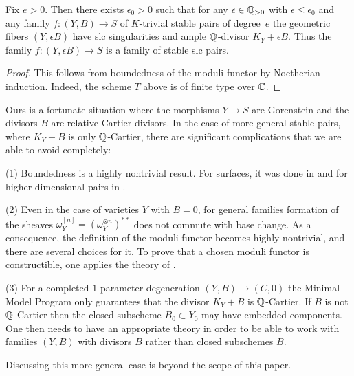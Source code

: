\documentclass[table,x11names]{amsart}
\begin{document}
\begin{corollary}
  Fix $e>0$. Then there exists $\epsilon_0>0$ such that for any
  $\epsilon\in{\mathbb Q}_{>0}$ with $\epsilon\le\epsilon_0$ and any family
  $f\colon (Y,B)\to S$ of $K$-trivial stable pairs of degree~$e$
  the geometric fibers $(Y,\epsilon B)$ have slc singularities and
  ample ${\mathbb Q}$-divisor $K_Y+\epsilon B$. Thus the family
  $f\colon (Y,\epsilon B)\to S$ is a family of stable slc pairs.
\end{corollary}
\begin{proof}
  This follows from boundedness of the moduli functor by Noetherian
  induction. Indeed, the scheme $T$ above is of finite type over
  ${\mathbb C}$.
\end{proof}

\begin{remark} \label{rem:general-slc-moduli} Ours is a fortunate
  situation where the morphisms $Y\to S$ are Gorenstein and the
  divisors $B$ are relative Cartier divisors. In the case of more
  general stable pairs, where $K_Y+B$ is only ${\mathbb Q}$-Cartier, there are
  significant complications that we are able to avoid completely:

  (1) Boundedness is a highly nontrivial result. For surfaces, it was
  done in \cite{alexeev1994boundedness-and-ksp-2} and for higher
  dimensional pairs in \cite{hacon2018boundedness-moduli}.

  (2) Even in the case of varieties $Y$ with $B=0$, for general
  families formation of the sheaves
  $\omega_Y^{[n]}=(\omega_Y^{\otimes n})^{**}$ does not commute with
  base change.  As a consequence, the definition of the moduli functor
  becomes highly nontrivial, and there are several choices for it. To
  prove that a chosen moduli functor is constructible, one applies the
  theory of \cite{kollar2008hulls-and-husks}.

  (3) For a completed $1$-parameter degeneration $(Y,B)\to (C,0)$
  the Minimal Model Program only guarantees that the divisor
  $K_Y+B$ is ${\mathbb Q}$-Cartier. If $B$ is not ${\mathbb Q}$-Cartier then the
  closed subscheme $B_0\subset Y_0$ may have embedded
  components. One then needs to have an appropriate theory in order to
  be able to work with families $(Y,B)$ with divisors $B$ rather than
  closed subschemes $B$.

  Discussing this more general case is beyond the scope of this paper.
\end{remark}
\end{document}
